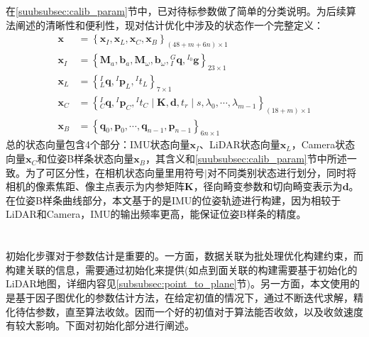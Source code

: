 \label{subsec:state_vector_define}
在\ref{suubsubsec:calib_param}节中，已对待标参数做了简单的分类说明。为后续算法阐述的清晰性和便利性，现对估计优化中涉及的状态作一个完整定义：
\begin{equation}
  \begin{aligned}
    \boldsymbol{x}   & =\left\lbrace
    \boldsymbol{x}_I,\boldsymbol{x}_L,\boldsymbol{x}_C,\boldsymbol{x}_B
    \right\rbrace_{(48+m+6n)\times 1}                                                                                                                                                                      \\
    \boldsymbol{x}_I & =\left\lbrace\boldsymbol{M}_{a},\boldsymbol{b}_a,\boldsymbol{M}_{\omega},\boldsymbol{b}_\omega,{^{G}_{I}\boldsymbol{q}}, {^{I_0}\boldsymbol{g}} \right\rbrace_{23\times 1}          \\
    \boldsymbol{x}_L & =\left\lbrace{^{I}_{L}\boldsymbol{q}},{^{I}}\boldsymbol{p}_{L},{^{I}t_{L}}\right\rbrace_{7\times 1}                                                                                 \\
    \boldsymbol{x}_C & =\left\lbrace {^{I}_{C}\boldsymbol{q}},{^{I}}\boldsymbol{p}_{C},{^{I}t_{C}}\mid\boldsymbol{K},\boldsymbol{d},t_r\mid s,\lambda_0,\cdots,\lambda_{m-1}\right\rbrace_{(18+m)\times 1} \\
    \boldsymbol{x}_B & =\left\lbrace \boldsymbol{q}_0,\boldsymbol{p}_0,\cdots,\boldsymbol{q}_{n-1},\boldsymbol{p}_{n-1}\right\rbrace_{6n\times 1}
  \end{aligned}
\end{equation}
总的状态向量包含4个部分：IMU状态向量$\boldsymbol{x}_I$、LiDAR状态向量$\boldsymbol{x}_L$，Camera状态向量$\boldsymbol{x}_C$和位姿B样条状态向量$\boldsymbol{x}_B$，其含义和\ref{suubsubsec:calib_param}节中所述一致。为了可区分性，在相机状态向量里用符号$\mid$对不同类别状态进行划分，同时将相机的像素焦距、像主点表示为内参矩阵$\boldsymbol{K}$，径向畸变参数和切向畸变表示为$\boldsymbol{d}$。在位姿B样条曲线部分，本文基于的是IMU的位姿轨迹进行构建，因为相较于LiDAR和Camera，IMU的输出频率更高，能保证位姿B样条的精度。

\section{}
初始化步骤对于参数估计是重要的。一方面，数据关联为批处理优化构建约束，而构建关联的信息，需要通过初始化来提供(如点到面关联的构建需要基于初始化的LiDAR地图，详细内容见\ref{subsubsec:point_to_plane}节)。另一方面，本文使用的是基于因子图优化的参数估计方法，在给定初值的情况下，通过不断迭代求解，精化待估参数，直至算法收敛。因而一个好的初值对于算法能否收敛，以及收敛速度有较大影响。下面对初始化部分进行阐述。
